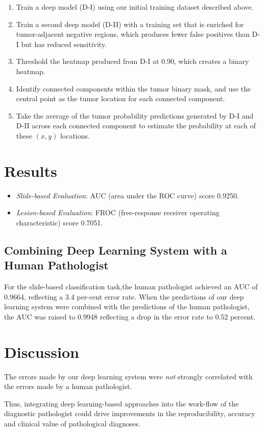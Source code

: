 \documentclass[a4paper,12pt]{article}
\begin{document}
\begin{enumerate}
  \setlength\itemsep{0em}
  \item Train a deep model (D-I) using our initial training dataset described above.
  \item Train a second deep model (D-II) with a training set that is enriched for tumor-adjacent negative regions, which produces fewer false positives than D-I but has reduced sensitivity.
  \item Threshold the heatmap produced from D-I at 0.90, which creates a binary heatmap.
  \item Identify connected components within the tumor binary mask, and use the central point as the tumor location for each connected component.
  \item Take the average of the tumor probability predictions generated by D-I and D-II across each connected component to estimate the probability at each of these $(x, y)$ locations.
\end{enumerate}

\section{Results}

\begin{itemize}
  \setlength\itemsep{0em}
  \item \emph{Slide-based Evaluation}: AUC (area under the ROC curve) score 0.9250.
  \item \emph{Lesion-based Evaluation}: FROC (free-response receiver operating characteristic) score 0.7051.
\end{itemize}

\subsection{Combining Deep Learning System with a Human Pathologist}

For the slide-based classification task,the human pathologist achieved an AUC of 0.9664, reflecting a 3.4 per-cent error rate. When the predictions of our deep learning system were combined with the predictions of the human pathologist, the AUC was raised to 0.9948 reflecting a drop in the error rate to 0.52 percent.

\section{Discussion}

The errors made by our deep learning system were \emph{not} strongly correlated with the errors made by a human pathologist.

Thus, integrating deep learning-based approaches into the work-flow of the diagnostic pathologist could drive improvements in the reproducibility, accuracy and clinical value of pathological diagnoses.
\end{document}

